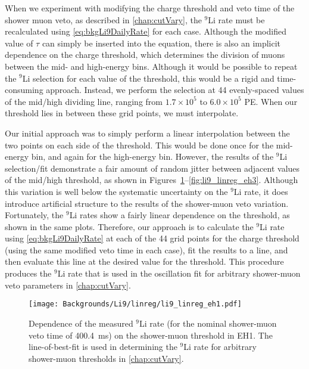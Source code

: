 \documentclass[../thesis.tex]{subfiles}
\begin{document}
When we experiment with modifying the charge threshold and veto time of the shower muon veto, as described in \autoref{chap:cutVary}, the $^9$Li rate must be recalculated using \autoref{eq:bkgLi9DailyRate} for each case. Although the modified value of $\tau$ can simply be inserted into the equation, there is also an implicit dependence on the charge threshold, which determines the division of muons between the mid- and high-energy bins. Although it would be possible to repeat the $^9$Li selection for each value of the threshold, this would be a rigid and time-consuming approach. Instead, we perform the selection at 44 evenly-spaced values of the mid/high dividing line, ranging from $1.7\times10^5$ to $6.0\times10^5$ PE\@. When our threshold lies in between these grid points, we must interpolate.

Our initial approach was to simply perform a linear interpolation between the two points on each side of the threshold. This would be done once for the mid-energy bin, and again for the high-energy bin. However, the results of the $^9$Li selection/fit demonstrate a fair amount of random jitter between adjacent values of the mid/high threshold, as shown in Figures~\ref{fig:li9_linreg_eh1}--\ref{fig:li9_linreg_eh3}. Although this variation is well below the systematic uncertainty on the $^9$Li rate, it does introduce artificial structure to the results of the shower-muon veto variation. Fortunately, the $^9$Li rates show a fairly linear dependence on the threshold, as shown in the same plots. Therefore, our approach is to calculate the $^9$Li rate using \autoref{eq:bkgLi9DailyRate} at each of the 44 grid points for the charge threshold (using the same modified veto time in each case), fit the results to a line, and then evaluate this line at the desired value for the threshold.
This procedure produces the $^9$Li rate that is used in the oscillation fit for arbitrary shower-muon veto parameters in \autoref{chap:cutVary}.

\begin{figure}[ht]
  \texttt{[image: Backgrounds/Li9/linreg/li9\_linreg\_eh1.pdf]}
  \caption{Dependence of the measured $^9$Li rate (for the nominal shower-muon veto time of 400.4~ms) on the shower-muon threshold in EH1. The line-of-best-fit is used in determining the $^9$Li rate for arbitrary shower-muon thresholds in \autoref{chap:cutVary}.}
  \label{fig:li9_linreg_eh1}
\end{figure}
\end{document}
